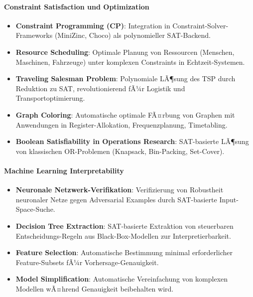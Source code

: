 ﻿\documentclass[a4paper,12pt]{article}
\theoremstyle{definition}
\begin{document}
\paragraph{Constraint Satisfaction und Optimization}

\begin{itemize}
	\item \textbf{Constraint Programming (CP)}: Integration in Constraint-Solver-Frameworks (MiniZinc, Choco) als polynomieller SAT-Backend.
	
	\item \textbf{Resource Scheduling}: Optimale Planung von Ressourcen (Menschen, Maschinen, Fahrzeuge) unter komplexen Constraints in Echtzeit-Systemen.
	
	\item \textbf{Traveling Salesman Problem}: Polynomiale LÃ¶sung des TSP durch Reduktion zu SAT, revolutionierend fÃ¼r Logistik und Transportoptimierung.
	
	\item \textbf{Graph Coloring}: Automatische optimale FÃ¤rbung von Graphen mit Anwendungen in Register-Allokation, Frequenzplanung, Timetabling.
	
	\item \textbf{Boolean Satisfiability in Operations Research}: SAT-basierte LÃ¶sung von klassischen OR-Problemen (Knapsack, Bin-Packing, Set-Cover).
\end{itemize}

\paragraph{Machine Learning Interpretability}

\begin{itemize}
	\item \textbf{Neuronale Netzwerk-Verifikation}: Verifizierung von Robustheit neuronaler Netze gegen Adversarial Examples durch SAT-basierte Input-Space-Suche.
	
	\item \textbf{Decision Tree Extraction}: SAT-basierte Extraktion von steuerbaren Entscheidungs-Regeln aus Black-Box-Modellen zur Interpretierbarkeit.
	
	\item \textbf{Feature Selection}: Automatische Bestimmung minimal erforderlicher Feature-Subsets fÃ¼r Vorhersage-Genauigkeit.
	
	\item \textbf{Model Simplification}: Automatische Vereinfachung von komplexen Modellen wÃ¤hrend Genauigkeit beibehalten wird.
\end{itemize}
\end{document}
